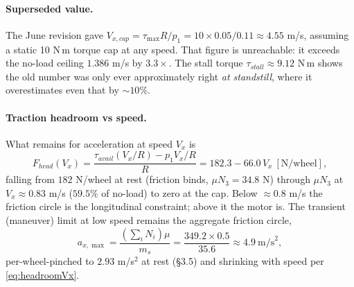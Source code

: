 \documentclass[11pt]{article}
\begin{document}
\paragraph{Superseded value.} The June revision gave
$V_{x,cap}=\tau_{\max}R/p_1=10\times0.05/0.11\approx4.55$ m/s, assuming a static 10 N\,m torque
cap at any speed. That figure is unreachable: it exceeds the no-load ceiling $1.386$ m/s by
$3.3\times$. The stall torque $\tau_{stall}\approx9.12$ N\,m shows the old number was only
ever approximately right \emph{at standstill}, where it overestimates even that by $\sim10\%$.

\paragraph{Traction headroom vs speed.} What remains for acceleration at speed $V_x$ is
\begin{equation}
F_{head}(V_x)=\frac{\tau_{avail}(V_x/R)-p_1V_x/R}{R}
=182.3-66.0\,V_x\ [\text{N/wheel}],
\label{eq:headroomVx}
\end{equation}
falling from $182$ N/wheel at rest (friction binds, $\mu N_3=34.8$ N) through $\mu N_3$ at
$V_x\approx0.83$ m/s ($59.5\%$ of no-load) to zero at the cap. Below $\approx0.8$ m/s the
friction circle is the longitudinal constraint; above it the motor is. The transient
(maneuver) limit at low speed remains the aggregate friction circle,
\begin{equation}
a_{x,\max}=\frac{(\sum_iN_i)\mu}{m_s}=\frac{349.2\times0.5}{35.6}\approx4.9\ \text{m/s}^2 ,
\end{equation}
per-wheel-pinched to $2.93$ m/s$^2$ at rest (\S3.5) and shrinking with speed per
\eqref{eq:headroomVx}.
\end{document}
